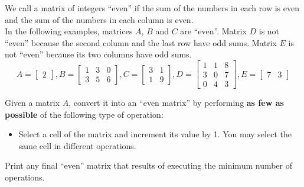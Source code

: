 %

We call a matrix of integers ``even'' if the sum of the numbers in each row is even and the sum of the numbers in each column is even.\\

In the following examples, matrices $A$, $B$ and $C$ are ``even''. Matrix $D$ is not ``even'' because the second column and the last row have odd sums.  Matrix $E$ is not ``even'' because its two columns have odd sums.\\

\begin{equation*}
  A =
  \begin{bmatrix}
    2
  \end{bmatrix},
  B =
  \begin{bmatrix}
    1 & 3 & 0 \\
    3 & 5 & 6
  \end{bmatrix},
  C =
  \begin{bmatrix}
    3 & 1 \\
    1 & 9
  \end{bmatrix},
  D =
  \begin{bmatrix}
    1 & 1 & 8 \\
    3 & 0 & 7 \\
    0 & 4 & 3
  \end{bmatrix},
  E =
  \begin{bmatrix}
    7 & 3
  \end{bmatrix}
\end{equation*}


Given a matrix $A$, convert it into an ``even matrix'' by performing \textbf{as few as possible} of the following type of operation:\\

\begin{itemize}
  \item Select a cell of the matrix and increment its value by 1. You may select
        the same cell in different operations.
\end{itemize}

Print any final ``even'' matrix that results of executing the minimum number of operations.

%
%

